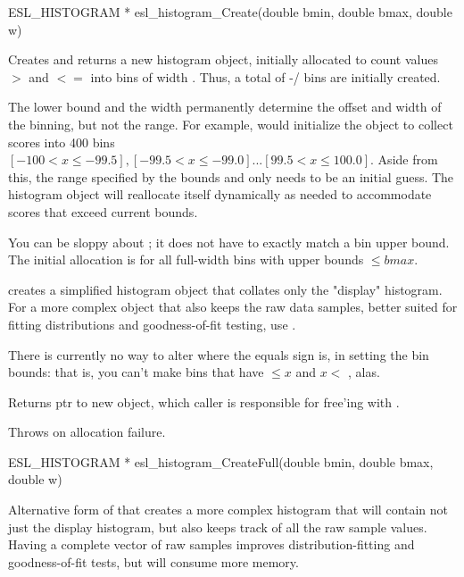 \begin{sreapi}
\hypertarget{func:esl_histogram_Create()}
{\item[ESL\_HISTOGRAM * esl\_histogram\_Create(double bmin, double bmax, double w)]}

Creates and returns a new histogram object, initially
allocated to count values $>$  and $<=$  into
bins of width . Thus, a total of -/ bins
are initially created. 

The lower bound  and the width  permanently
determine the offset and width of the binning, but not
the range.  For example,  would initialize the object to collect scores into
400 bins $[-100< x \leq -99.5],[-99.5 < x \leq
-99.0]...[99.5 <x \leq 100.0]$.  Aside from this, the
range specified by the bounds  and  only
needs to be an initial guess. The histogram object will
reallocate itself dynamically as needed to accommodate
scores that exceed current bounds.

You can be sloppy about ; it does not have to
exactly match a bin upper bound. The initial allocation
is for all full-width bins with upper bounds $\leq
bmax$.

 creates a simplified histogram
object that collates only the "display" histogram. For
a more complex object that also keeps the raw data samples,
better suited for fitting distributions and goodness-of-fit
testing, use .

There is currently no way to alter where the equals sign
is, in setting the bin bounds: that is, you can't make bins
that have  $\leq x$ and $x <$ , alas.


Returns ptr to new  object, which caller is responsible
for free'ing with .

Throws  on allocation failure.


\hypertarget{func:esl_histogram_CreateFull()}
{\item[ESL\_HISTOGRAM * esl\_histogram\_CreateFull(double bmin, double bmax, double w)]}

Alternative form of  that 
creates a more complex histogram that will contain not just the 
display histogram, but also keeps track of all
the raw sample values. Having a complete vector of raw
samples improves distribution-fitting and goodness-of-fit 
tests, but will consume more memory. 



\end{sreapi}

